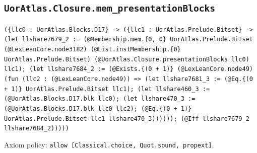 \documentclass[11pt]{article}
\begin{document}
\subsection*{\texttt{UorAtlas.Closure.mem\_presentationBlocks}}
\noindent\texttt{(\{llc0 : UorAtlas.Blocks.D17\} -> (\{llc1 : UorAtlas.Prelude.Bitset\} -> (let llshare7679\_2 := (@Membership.mem.\{0, 0\} UorAtlas.Prelude.Bitset (@LexLeanCore.node3182) (@List.instMembership.\{0\} UorAtlas.Prelude.Bitset) (@UorAtlas.Closure.presentationBlocks llc0) llc1); (let llshare7684\_2 := (@Exists.\{(0 + 1)\} (@LexLeanCore.node49) (fun (llc2 : (@LexLeanCore.node49)) => (let llshare7681\_3 := (@Eq.\{(0 + 1)\} UorAtlas.Prelude.Bitset llc1); (let llshare460\_3 := (@UorAtlas.Blocks.D17.blk llc0); (let llshare470\_3 := (@UorAtlas.Blocks.D17.blk llc0 llc2); (@Eq.\{(0 + 1)\} UorAtlas.Prelude.Bitset llc1 llshare470\_3)))))); (@Iff llshare7679\_2 llshare7684\_2)))))}\par
\noindent Axiom policy: \texttt{allow [Classical.choice, Quot.sound, propext]}.\par
\end{document}
